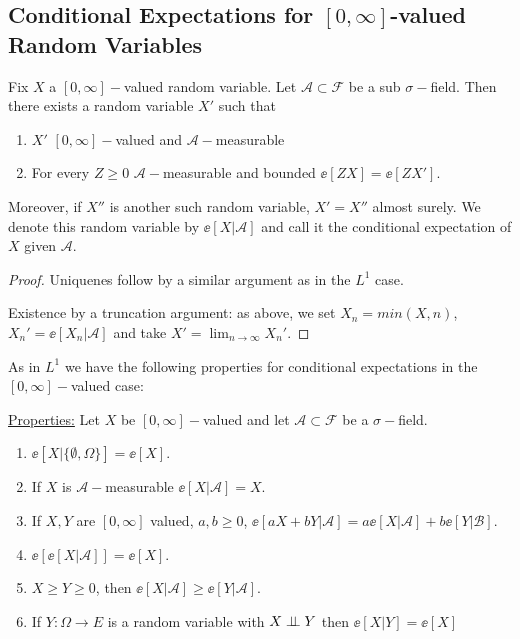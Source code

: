 \documentclass[../main.tex]{subfiles}
\begin{document}
    \subsection{Conditional Expectations for $[0, \infty]$-valued Random Variables}

    \begin{theorem}
      Fix $X$ a $[0, \infty]-$valued random variable. 
      Let $\mathcal{A} \subset \mathcal{F}$ be a sub $\sigma-$field. Then
      there exists a random variable $X'$ such that
      \begin{enumerate}
        \item $X'$ $[0, \infty]-$valued and $\mathcal{A}-$measurable
        \item For every $Z \geq 0$ $\mathcal{A}-$measurable and bounded $\ee[ZX] =
          \ee[ZX']$.
      \end{enumerate}
      Moreover, if $X''$ is another such random variable, $X' = X''$ almost
      surely. We denote this random variable by $\ee[X | \mathcal{A}]$ and
      call it the conditional expectation of $X$ given $\mathcal{A}$.
    \end{theorem}
    \begin{proof}
        Uniquenes follow by a similar argument as in the $L^1$ case.

        Existence by a truncation argument: as above, we set $X_n  = min(X,
        n)$, $X_n' = \ee[X_n | \mathcal{A}]$ and take $X' = \lim_{n \to
        \infty}X_n'$.
    \end{proof}

    As in $L^1$ we have the following properties for conditional expectations
    in the $[0, \infty]-$valued case:

    \vspace{1em}\noindent

    \underline{Properties:} Let $X$ be $[0, \infty]-$valued and let
    $\mathcal{A} \subset \mathcal{F}$ be a $\sigma-$field.
    \begin{enumerate}
      \item $\ee[X | \{ \emptyset, \Omega \}] = \ee[X]$.
      \item If $X$ is $\mathcal{A}-$measurable $\ee[X | \mathcal{A}] = X$.
      \item If $X, Y$ are $[0, \infty]$ valued, $a, b \geq 0$, $\ee[aX + bY |
        \mathcal{A}] = a\ee[X | \mathcal{A}] + b \ee[Y | \mathcal{B}]$.
      \item $\ee[\ee[X | \mathcal{A}]] = \ee[X]$.
      \item $X \geq Y \geq 0$, then $\ee[X | \mathcal{A}] \geq \ee[Y |
        \mathcal{A}]$.
      \item If $Y \colon \Omega \to E$ is a random variable with $X \perp\!\!\!\!\,\perp Y$
        then $\ee[X | Y] = \ee[X]$
    \end{enumerate}
\end{document}
